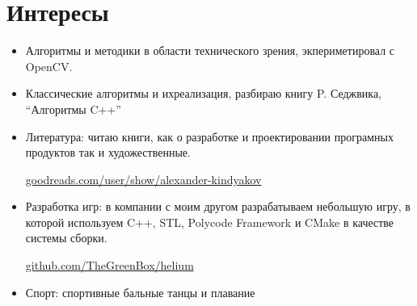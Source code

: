 \documentclass[a4paper, 10pt]{article}
\begin{document}
\section{Интересы}
\begin{itemize}
    \item Алгоритмы и методики в области технического зрения, экпериметировал с OpenCV.
    \item Классические алгоритмы и ихреализация, разбираю книгу P. Седжвика, ``Алгоритмы C++''
    \item Литература: читаю книги, как о разработке и проектировании програмных
продуктов так и художественные. 

\href{http://www.goodreads.com/user/show/24404721-alexander-kindyakov}{goodreads.com/user/show/alexander-kindyakov}    
    \item Разработка игр: в компании с моим другом разрабатываем небольшую игру, в которой
используем C++, STL, Polycode Framework и CMake в качестве системы сборки.
 
\href{https://github.com/TheGreenBox/helium}{github.com/TheGreenBox/helium}
    \item Спорт: спортивные бальные танцы и плавание
\end{itemize}
\end{document}
